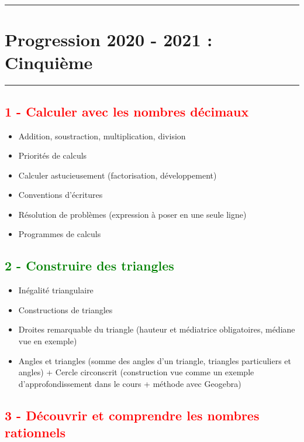 \documentclass[12pt]{article}
\newcommand{\horrule}[1]{\rule{\linewidth}{#1}} %
\begin{document}
\setlength{\columnseprule}{1pt}

\horrule{2px}
\section*{Progression 2020 - 2021 : Cinquième}
\horrule{2px}

\begin{multicols}{2}

\subsection*{\textcolor{red}{1 - Calculer avec les nombres décimaux}}

\begin{itemize}
\item Addition, soustraction, multiplication, division
\item Priorités de calculs 
\item Calculer astucieusement (factorisation, développement)
\item Conventions d’écritures
\item Résolution de problèmes (expression à poser en une seule ligne)
\item Programmes de calculs
\end{itemize}

\subsection*{\textcolor{green}{2 - Construire des triangles}}

\begin{itemize}
\item Inégalité triangulaire
\item Constructions de triangles
\item Droites remarquable du triangle (hauteur et médiatrice obligatoires, médiane vue en exemple)
\item Angles et triangles (somme des angles d’un triangle, triangles particuliers et angles)
+ Cercle circonscrit (construction vue comme un exemple d'approfondissement dans le cours + méthode avec Geogebra)
\end{itemize}

\subsection*{\textcolor{red}{3 - Découvrir et comprendre les nombres rationnels}}


\end{multicols}
\end{document}

